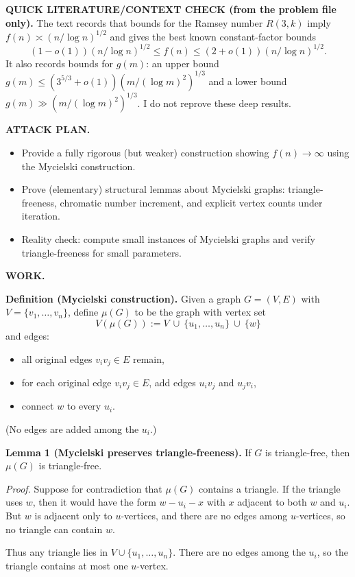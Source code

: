 \medskip
\noindent\textbf{QUICK LITERATURE/CONTEXT CHECK (from the problem file only).}
The text records that bounds for the Ramsey number $R(3,k)$ imply $f(n)\asymp (n/\log n)^{1/2}$ and gives the best known constant-factor bounds
\[(1-o(1))(n/\log n)^{1/2}\le f(n)\le (2+o(1))(n/\log n)^{1/2}.
\]
It also records bounds for $g(m)$: an upper bound $g(m)\le (3^{5/3}+o(1))(m/(\log m)^2)^{1/3}$ and a lower bound $g(m)\gg (m/(\log m)^2)^{1/3}$.
I do not reprove these deep results.

\medskip
\noindent\textbf{ATTACK PLAN.}
\begin{itemize}
\item Provide a fully rigorous (but weaker) construction showing $f(n)\to\infty$ using the Mycielski construction.
\item Prove (elementary) structural lemmas about Mycielski graphs: triangle-freeness, chromatic number increment, and explicit vertex counts under iteration.
\item Reality check: compute small instances of Mycielski graphs and verify triangle-freeness for small parameters.
\end{itemize}

\medskip
\noindent\textbf{WORK.}

\medskip
\noindent\textbf{Definition (Mycielski construction).}
Given a graph $G=(V,E)$ with $V=\{v_1,\dots,v_n\}$, define $\mu(G)$ to be the graph with vertex set
\[V(\mu(G)):=V\ \cup\ \{u_1,\dots,u_n\}\ \cup\ \{w\}
\]
and edges:
\begin{itemize}
\item all original edges $v_iv_j\in E$ remain,
\item for each original edge $v_iv_j\in E$, add edges $u_iv_j$ and $u_jv_i$,
\item connect $w$ to every $u_i$.
\end{itemize}
(No edges are added among the $u_i$.)

\medskip
\noindent\textbf{Lemma 1 (Mycielski preserves triangle-freeness).}
If $G$ is triangle-free, then $\mu(G)$ is triangle-free.

\noindent\emph{Proof.}
Suppose for contradiction that $\mu(G)$ contains a triangle.
If the triangle uses $w$, then it would have the form $w-u_i-x$ with $x$ adjacent to both $w$ and $u_i$.
But $w$ is adjacent only to $u$-vertices, and there are no edges among $u$-vertices, so no triangle can contain $w$.

Thus any triangle lies in $V\cup\{u_1,\dots,u_n\}$.
There are no edges among the $u_i$, so the triangle contains at most one $u$-vertex.

